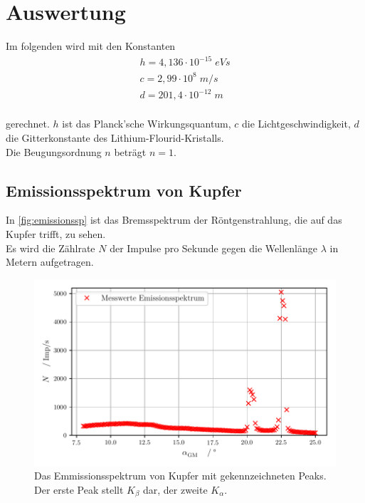 \section{Auswertung}
\label{sec:Auswertung}

Im folgenden wird mit den Konstanten 
\begin{align*}
  h = 4,136 \cdot 10^{-15} \; eVs\\
  c = 2,99 \cdot 10^8 \; m/s \\
  d = 201,4 \cdot 10^{-12}\; m \\
\end{align*}

gerechnet. $h$ ist das Planck'sche Wirkungsquantum, $c$ die Lichtgeschwindigkeit,
$d$ die Gitterkonstante des Lithium-Flourid-Kristalls.\\
Die Beugungsordnung $n$ beträgt $n = 1$.




\subsection{Emissionsspektrum von Kupfer}
\label{subsec:spektrumCU}


In \autoref{fig:emissionssp} ist das Bremsspektrum der Röntgenstrahlung, die auf das Kupfer trifft, zu sehen.\\
Es wird die Zählrate $N$ der Impulse pro Sekunde gegen die Wellenlänge $\lambda$ in Metern aufgetragen.\\

\begin{figure}
  \centering
  \includegraphics{build/emissionsspektrum.pdf}
  \caption{Das Emmissionsspektrum von Kupfer mit gekennzeichneten Peaks. Der erste Peak stellt $K_{\beta}$ dar, der zweite $K_{\alpha}$.}
  \label{fig:emissionssp}
\end{figure}


